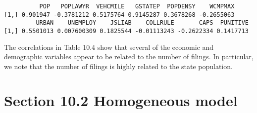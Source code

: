\documentclass[]{book}
\newenvironment{Shaded}{\begin{snugshade}}{\end{snugshade}}
\newcommand{\DataTypeTok}[1]{\textcolor[rgb]{0.13,0.29,0.53}{#1}}
\newcommand{\DecValTok}[1]{\textcolor[rgb]{0.00,0.00,0.81}{#1}}
\newcommand{\KeywordTok}[1]{\textcolor[rgb]{0.13,0.29,0.53}{\textbf{#1}}}
\newcommand{\NormalTok}[1]{#1}
\newcommand{\OperatorTok}[1]{\textcolor[rgb]{0.81,0.36,0.00}{\textbf{#1}}}
\newcommand{\StringTok}[1]{\textcolor[rgb]{0.31,0.60,0.02}{#1}}
\begin{document}
\begin{Shaded}
\end{Shaded}

\begin{verbatim}
          POP   POPLAWYR  VEHCMILE   GSTATEP  POPDENSY    WCMPMAX
[1,] 0.901947 -0.3781212 0.5175764 0.9145287 0.3678268 -0.2655063
         URBAN    UNEMPLOY    JSLIAB    COLLRULE       CAPS  PUNITIVE
[1,] 0.5501013 0.007600309 0.1825544 -0.01113243 -0.2622334 0.1417713
\end{verbatim}

The correlations in Table 10.4 show that several of the economic and demographic variables appear to be related to the number of filings. In particular, we note that the number of filings is highly related to the state population.

\hypertarget{section-10.2-homogeneous-model}{%
\section{Section 10.2 Homogeneous model}\label{section-10.2-homogeneous-model}}

\begin{Shaded}
\end{Shaded}
\end{document}
